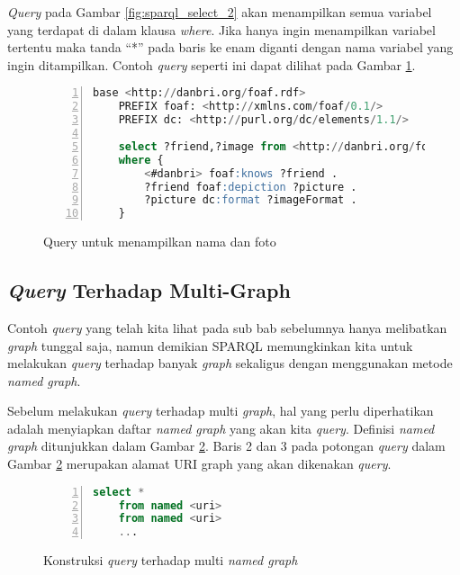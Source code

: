 \emph{Query} pada Gambar \ref{fig:sparql_select_2} akan menampilkan semua variabel yang terdapat di dalam klausa \emph{where}. Jika hanya ingin menampilkan variabel tertentu maka tanda ``*'' pada baris ke enam diganti dengan nama variabel yang ingin ditampilkan. Contoh \emph{query} seperti ini dapat dilihat pada Gambar \ref{fig:sparql_select_3}.

\begin{figure}[hb]
	\centering
	\begin{lstlisting}[language=SQL,numbers=left]
	base <http://danbri.org/foaf.rdf>
	PREFIX foaf: <http://xmlns.com/foaf/0.1/>
	PREFIX dc: <http://purl.org/dc/elements/1.1/>

	select ?friend,?image from <http://danbri.org/foaf.rdf>
	where {
		<#danbri> foaf:knows ?friend .
		?friend foaf:depiction ?picture .
		?picture dc:format ?imageFormat .
	}\end{lstlisting}
	\caption{Query untuk menampilkan nama dan foto}
	\label{fig:sparql_select_3}
\end{figure}

\subsection{\emph{Query} Terhadap Multi-Graph}
Contoh \emph{query} yang telah kita lihat pada sub bab sebelumnya hanya melibatkan \emph{graph} tunggal saja, namun demikian SPARQL memungkinkan kita untuk melakukan \emph{query} terhadap banyak \emph{graph} sekaligus dengan menggunakan metode \emph{named graph}.

Sebelum melakukan \emph{query} terhadap multi \emph{graph}, hal yang perlu diperhatikan adalah menyiapkan daftar \emph{named graph} yang akan kita \emph{query}. Definisi \emph{named graph} ditunjukkan dalam Gambar \ref{fig:definisi_named_graph}. Baris 2 dan 3 pada potongan \emph{query} dalam Gambar \ref{fig:definisi_named_graph} merupakan alamat URI graph yang akan dikenakan \emph{query}.

\begin{figure}[ht]
	\centering
	\begin{lstlisting}[language=SQL, numbers=left]
	select *
	from named <uri>
	from named <uri>
	...\end{lstlisting}
	\caption{Konstruksi \emph{query} terhadap multi \emph{named graph} \citep{liyang_yu}}
	\label{fig:definisi_named_graph}
\end{figure}